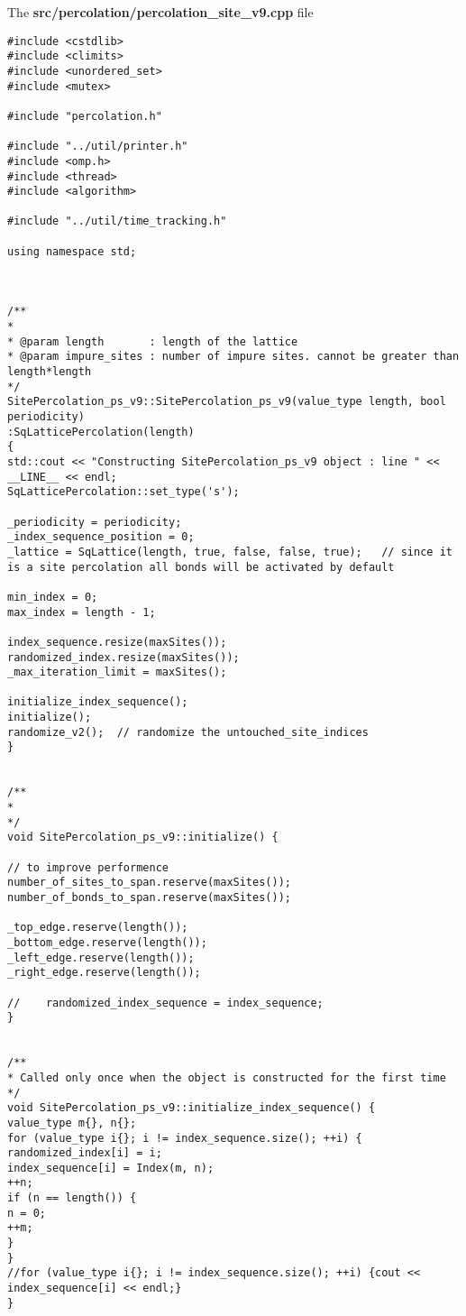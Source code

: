 The \textbf{src/percolation/percolation_site_v9.cpp} file

\begin{lstlisting}[style=CStyle]
#include <cstdlib>
#include <climits>
#include <unordered_set>
#include <mutex>

#include "percolation.h"

#include "../util/printer.h"
#include <omp.h>
#include <thread>
#include <algorithm>

#include "../util/time_tracking.h"

using namespace std;



/**
*
* @param length       : length of the lattice
* @param impure_sites : number of impure sites. cannot be greater than length*length
*/
SitePercolation_ps_v9::SitePercolation_ps_v9(value_type length, bool periodicity)
:SqLatticePercolation(length)
{
std::cout << "Constructing SitePercolation_ps_v9 object : line " << __LINE__ << endl;
SqLatticePercolation::set_type('s');

_periodicity = periodicity;
_index_sequence_position = 0;
_lattice = SqLattice(length, true, false, false, true);   // since it is a site percolation all bonds will be activated by default

min_index = 0;
max_index = length - 1;

index_sequence.resize(maxSites());
randomized_index.resize(maxSites());
_max_iteration_limit = maxSites();

initialize_index_sequence();
initialize();
randomize_v2();  // randomize the untouched_site_indices
}


/**
*
*/
void SitePercolation_ps_v9::initialize() {

// to improve performence
number_of_sites_to_span.reserve(maxSites());
number_of_bonds_to_span.reserve(maxSites());

_top_edge.reserve(length());
_bottom_edge.reserve(length());
_left_edge.reserve(length());
_right_edge.reserve(length());

//    randomized_index_sequence = index_sequence;
}


/**
* Called only once when the object is constructed for the first time
*/
void SitePercolation_ps_v9::initialize_index_sequence() {
value_type m{}, n{};
for (value_type i{}; i != index_sequence.size(); ++i) {
randomized_index[i] = i;
index_sequence[i] = Index(m, n);
++n;
if (n == length()) {
n = 0;
++m;
}
}
//for (value_type i{}; i != index_sequence.size(); ++i) {cout << index_sequence[i] << endl;}
}



\end{lstlisting}

